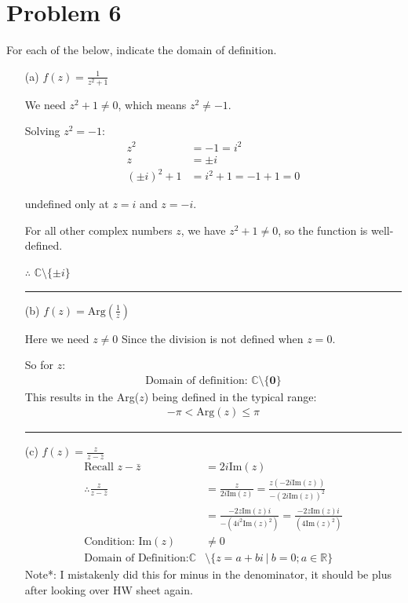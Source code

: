 \documentclass{article}
\begin{document}
\section*{Problem 6}
For each of the below, indicate the domain of definition.
\begin{enumerate}
\item[(a)] $f(z) = \frac{1}{z^2+1}$

 We need $z^2 + 1 \neq 0$, which means $z^2 \neq -1$.

Solving $z^2 = -1$:
\begin{align*}
z^2 &= -1 = i^2 \\
z &= \pm i\\
(\pm i)^2 + 1 &= i^2 + 1 = -1 + 1 = 0
\end{align*}

undefined only at $z = i$ and $z = -i$.

For all other complex numbers $z$, we have $z^2 + 1 \neq 0$, so the function is well-defined.

$\therefore$  $\mathbb{C} \setminus \{\pm i\}$
 \vspace{1cm}
 \hrule
\item[(b)] $f(z) = \text{Arg}\left(\frac{1}{z}\right)$

  Here we need $z \neq 0$ Since the division is not defined when $z = 0$.

  So for $z$:
\begin{align*}
  \text{Domain of definition: } \mathbb{C} \setminus \{\textbf{0}\}
\end{align*}
This results in the Arg($z$) being defined in the typical range:
\begin{align*}
  -\pi < \text{Arg}(z) \le \pi
\end{align*}
 \vspace{1cm}
 \hrule
  \item[(c)] $f(z) = \frac{z}{z - \bar{z}}$
\begin{align*}
  \text{Recall } z-\bar z &= 2i\text{Im}(z) \\
  \therefore \frac{z}{z - \bar{z}} &= \frac{z}{2i\text{Im}(z)} = \frac{z(-2i\text{Im}(z))}{-(2i\text{Im}(z))^2}\\
                          &=\frac{-2z\text{Im}(z)i}{-(4i^2\text{Im}(z)^2)}=\frac{-2z\text{Im}(z)i}{(4\text{Im}(z)^2)}\\
  \text{Condition: Im}(z) &\neq 0 \\
  \text{Domain of Definition:} \mathbb{C} &\setminus \{z = a+bi\ |\ b = 0;a\in \mathbb{R}\}
\end{align*}
Note*: I mistakenly did this for minus in the denominator, it should be plus after looking over HW sheet again.


\end{enumerate}
\end{document}
